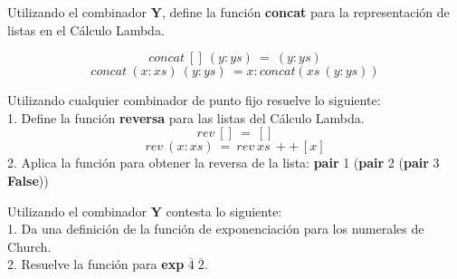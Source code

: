                 \begin{exercise}
                    Utilizando el combinador $\mathbf{Y}$, define la función \textbf{concat} para la representación de listas en el Cálculo Lambda.

                    \[
                        concat\ []\ (y:ys)\ =\ (y:ys)
                    \]
                    \[
                        concat\ (x:xs)\ (y:ys)\ = x:concat(xs\ (y:ys))
                    \]
                \end{exercise}

                \begin{exercise}
                    Utilizando cualquier combinador de punto fijo resuelve lo siguiente:\\
                    
                    1. Define la función \textbf{reversa} para las listas del Cálculo Lambda. \\
                    \[
                        rev\ []\ =\ []
                    \]
                    \[
                        rev\ (x:xs)\ =\ rev\ xs\ ++\ [x]
                    \]
                    2. Aplica la función para obtener la reversa de la lista: \textbf{pair} 1 (\textbf{pair} 2 (\textbf{pair} 3 \textbf{False}))
                \end{exercise}

                \begin{exercise}
                    Utilizando el combinador $\mathbf{Y}$ contesta lo siguiente: \\
                    
                    1. Da una definición de la función de exponenciación para los numerales de Church.\\
                    2. Resuelve la función para \textbf{exp} $\overline{4} \; \overline{2}$.
                \end{exercise}

%

                    
            